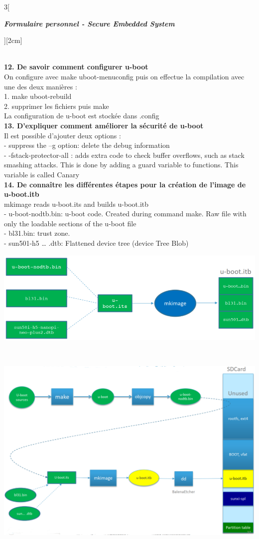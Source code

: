 \begin{multicols}{3}[\centerline{ \large\em \textbf{Formulaire personnel - Secure Embedded System}}][2cm]
\begin{minipage}{\linewidth}
\end{minipage}
\\ \textbf{12. De savoir comment configurer u-boot\\}
On configure avec make uboot-menuconfig puis on effectue la compilation avec une des deux manières :\\
1. make uboot-rebuild\\
2. supprimer les fichiers puis make\\
La configuration de u-boot est stockée dans .config
\\ \textbf{13. D’expliquer comment améliorer la sécurité de u-boot\\}
Il est possible d'ajouter deux options :\\
- suppress the –g option: delete the debug information\\
- -fstack-protector-all : adds extra code to check buffer overflows, such as stack smashing attacks. This is done by adding a guard variable to functions. This variable is called Canary
\\ \textbf{14. De connaître les différentes étapes pour la création de l’image de u-boot.itb\\}
mkimage reads u-boot.its and builds u-boot.itb\\
- u-boot-nodtb.bin: u-boot code. Created during command make. Raw file with only the loadable sections of the u-boot file\\
- bl31.bin: trust zone.\\
- sun501-h5 … .dtb: Flattened device tree (device Tree Blob)\\
\begin{minipage}{\linewidth}
	\centering
    \includegraphics[width =0.8\columnwidth]{images/13.png}
\end{minipage}\\
\begin{minipage}{\linewidth}
	\centering
    \includegraphics[width =0.8\columnwidth]{images/16.png}

\end{minipage}
\end{multicols}
